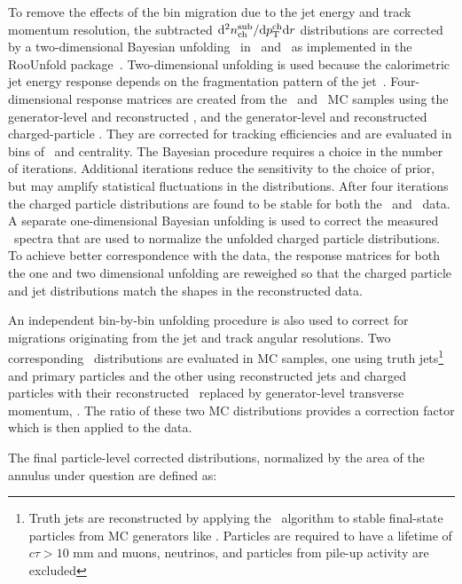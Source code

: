 
To remove the effects of the bin migration due to the jet energy and track momentum resolution, the subtracted $\mathrm{d}^2 \mbox{$n_{\mathrm{ch}}^{\mathrm{sub}}$} /\mathrm{d}\mbox{$p_{\mathrm{T}}^{\mathrm{ch}}$} \mathrm{d} r$ distributions are corrected by a two-dimensional Bayesian unfolding~\cite{DAgostini:1994zf}
in \pttrk\ and \ptjet\ as implemented in the RooUnfold package~\cite{Adye:2011gm}.  
Two-dimensional unfolding is used because the calorimetric jet energy response depends on the fragmentation pattern of the jet~\cite{Aad:2011he}.
Four-dimensional response matrices are created from the \pp\ and \pbpb\ MC samples using the generator-level and reconstructed \ptjet, and the generator-level and reconstructed charged-particle \pttrk. They are corrected for tracking efficiencies and are evaluated in bins of \rvar\ and centrality. The Bayesian procedure requires a choice in the number of iterations.
Additional iterations reduce the sensitivity to the choice of prior, but may
amplify statistical fluctuations in the distributions.
After four iterations the 
charged particle distributions are found to be stable for both the \PbPb\ and \pp\ data.
A separate one-dimensional Bayesian unfolding is used to correct the measured \ptjet\ spectra that are used to normalize the unfolded charged particle distributions.
To achieve better correspondence with the data, the response matrices for both the one and two dimensional unfolding are reweighed so that the charged particle and jet distributions match the shapes in the reconstructed data.

An independent bin-by-bin unfolding procedure is also used to correct for migrations originating from the jet and track angular resolutions. Two corresponding \Dptr\ distributions are evaluated in MC samples, one using truth jets\footnote{Truth jets are reconstructed by applying the \antikt\ algorithm to stable final-state particles from MC generators like \PYTHIA. Particles are required to have a lifetime of $c\tau > 10$ mm and muons, neutrinos, and particles from pile-up activity are excluded} and primary particles and the other using reconstructed jets and charged particles with their reconstructed \pt\ replaced by generator-level transverse momentum, \pTtrue. The ratio of these two MC distributions provides a correction factor which is then applied to the data. 

The final particle-level corrected distributions, normalized by the area of the annulus under question are defined as:

